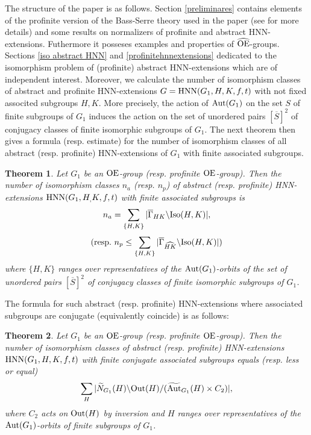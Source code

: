 \documentclass[a4paper,12pt]{article}
\newtheorem{thm}{Theorem}[section]
\newcommand{\Oe}{\rm \widehat{OE}}
\def\OE{{\rm OE}}
\def\aut {{\rm Aut}}
\def\out {{\rm Out}}
\def\hnn {{\rm HNN}}
\def\Iso {{\rm Iso}}
\begin{document}
The structure of the  paper is as follows.  Section \ref{preliminares} contains elements of the profinite version of the Bass-Serre theory used in the paper (see \cite{R} for more details) and some results on normalizers of profinite and  abstract HNN-extensions.  Futhermore it posseses  examples and properties of $\Oe$-groups. Sections \ref{iso abstract HNN} and \ref{profinitehnnextensions} dedicated to the isomorphism problem of (profinite) abstract HNN-extensions which are of independent interest. Moreover, we calculate the number of isomorphism classes of abstract and profinite HNN-extensions $G=\hnn(G_1, H, K, f, t)$ with not fixed associted subgroups $H,K$. More precisely,  the action of $\aut(G_1)$ on the set $S$ of finite subgroups of $G_1$ induces the action on the set of unordered pairs $[\overline{S}]^2$ of conjugacy classes of finite isomorphic subgroups of $G_1.$ 
The next theorem then gives a formula (resp. estimate) for the number of isomorphism classes of all abstract (resp. profinite) HNN-extensions of $G_1$ with finite associated subgroups.



\begin{thm} \label{int general finite associated} Let $G_1$ be  an $\OE$-group (resp. profinite $\OE$-group). Then the number  of isomorphism classes $n_a$ (resp. $n_p$) of  abstract (resp. profinite) HNN-extensions $\hnn(G_1, H_,K, f,t)$ with finite associated subgroups  is  $$n_a=\sum_{\{H, K\}} |\overline{\Gamma}_{HK} \backslash \Iso(H, K)|,$$
$$({\rm resp.}\  n_p\leq\sum_{\{H, K\}} |\overline{\Gamma}_{\widehat{HK}} \backslash \Iso(H, K)|) $$ where $\{H, K\}$ ranges over representatives of the $\aut(G_1)$-orbits of the set of unordered pairs $[\overline{S}]^2$ of conjugacy classes of finite isomorphic subgroups of $G_1$. 
\end{thm} 

The formula for such abstract (resp. profinite) HNN-extensions where associated subgroups are conjugate (equivalently coincide) is as follows:

\begin{thm}\label{int conjugate associated} Let $G_1$ be an $\OE$-group (resp. profinite $\OE$-group). Then the number of isomorphism classes of abstract (resp. profinite) HNN-extensions $\hnn(G_1, H, K, f, t)$ with finite conjugate associated subgroups  equals (resp. less or equal) $$\sum_{H} |\widetilde{N}_{G_1}(H) \backslash \out(H)/  ( \widetilde{\aut}_{G_1}(H) \times C_2) |,$$
 where $C_2$ acts on $\out(H)$ by inversion and $H$ ranges over representatives of the $\aut(G_1)$-orbits of finite subgroups of $G_1$.
\end{thm} 
\end{document}
